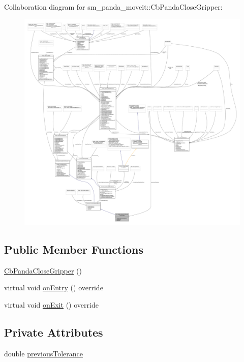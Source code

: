 Collaboration diagram for sm\+\_\+panda\+\_\+moveit\+:\+:Cb\+Panda\+Close\+Gripper\+:
\nopagebreak
\begin{figure}[H]
\begin{center}
\leavevmode
\includegraphics[width=350pt]{classsm__panda__moveit_1_1CbPandaCloseGripper__coll__graph}
\end{center}
\end{figure}
\subsection*{Public Member Functions}
\begin{DoxyCompactItemize}
\item 
\hyperlink{classsm__panda__moveit_1_1CbPandaCloseGripper_a6295c0b99d4b3548f79567d8aaed4b14}{Cb\+Panda\+Close\+Gripper} ()
\item 
virtual void \hyperlink{classsm__panda__moveit_1_1CbPandaCloseGripper_a755e506a4c47ec5f1485f2526c8a9e16}{on\+Entry} () override
\item 
virtual void \hyperlink{classsm__panda__moveit_1_1CbPandaCloseGripper_a0a51d63684baaba9d33fe272db237593}{on\+Exit} () override
\end{DoxyCompactItemize}
\subsection*{Private Attributes}
\begin{DoxyCompactItemize}
\item 
double \hyperlink{classsm__panda__moveit_1_1CbPandaCloseGripper_adb4d41d62eb40ca626f9d21bbec147a0}{previous\+Tolerance}
\end{DoxyCompactItemize}

